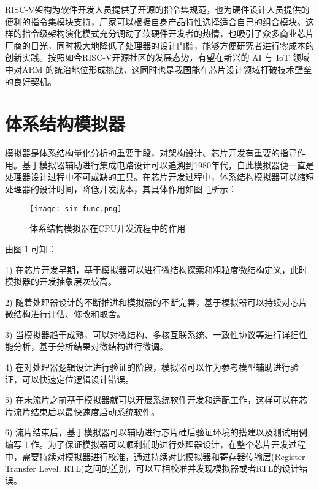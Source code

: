 




RISC-V架构为软件开发人员提供了开源的指令集规范，也为硬件设计人员提供的便利的指令集模块支持，厂家可以根据自身产品特性选择适合自己的组合模块。这样的指令级架构演化模式充分调动了软硬件开发者的热情，也吸引了众多商业芯片厂商的目光，同时极大地降低了处理器的设计门槛，能够方便研究者进行零成本的创新实践。按照如今RISC-V开源社区的发展态势，有望在新兴的 AI 与 IoT 领域中对ARM 的统治地位形成挑战，这同时也是我国能在芯片设计领域打破技术壁垒的良好契机。
\section{体系结构模拟器}
模拟器是体系结构量化分析的重要手段，对架构设计、芯片开发有重要的指导作用。基于模拟器辅助进行集成电路设计可以追溯到1980年代\cite{mukherjee2002performance}，自此模拟器便一直是处理器设计过程中不可或缺的工具。在芯片开发过程中，体系结构模拟器可以缩短处理器的设计时间，降低开发成本，其具体作用如图~\ref{fig:sim-func}所示：
\begin{figure}[h]
  \centering
  \texttt{[image: sim\_func.png]}
  \caption{体系结构模拟器在CPU开发流程中的作用}
  \label{fig:sim-func}
\end{figure}


由图１可知：


1) 在芯片开发早期，基于模拟器可以进行微结构探索和粗粒度微结构定义，此时模拟器的开发抽象层次较高。


2) 随着处理器设计的不断推进和模拟器的不断完善，基于模拟器可以持续对芯片微结构进行评估、修改和取舍。


3) 当模拟器趋于成熟，可以对微结构、多核互联系统、一致性协议等进行详细性能分析，基于分析结果对微结构进行微调。


4) 在对处理器逻辑设计进行验证的阶段，模拟器可以作为参考模型辅助进行验证，可以快速定位逻辑设计错误。


5) 在未流片之前基于模拟器就可以开展系统软件开发和适配工作，这样可以在芯片流片结束后以最快速度启动系统软件。


6) 流片结束后，基于模拟器可以辅助进行芯片硅后验证环境的搭建以及测试用例编写工作\cite{brooks2000wattch}。为了保证模拟器可以顺利辅助进行处理器设计，在整个芯片开发过程中，需要持续对模拟器进行校准，通过持续对比模拟器和寄存器传输层(Register-Transfer Level, RTL)之间的差别，可以互相校准并发现模拟器或者RTL的设计错误\cite{hourui}。



